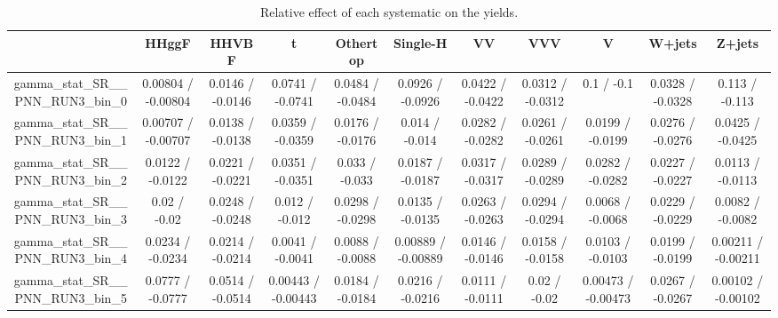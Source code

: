 \documentclass[10pt]{article}
\begin{document}
\begin{table}[htbp]
\begin{center}
\begin{tabular}{|c|c|c|c|c|c|c|c|c|c|c|}
\hline 
      & HHggF      & HHVBF      & t      & Othertop      & Single-H      & VV      & VVV      & V      & W+jets      & Z+jets \\ 
\hline 
  gamma_stat_SR__PNN_RUN3_bin_0 & 0.00804 / -0.00804 & 0.0146 / -0.0146 & 0.0741 / -0.0741 & 0.0484 / -0.0484 & 0.0926 / -0.0926 & 0.0422 / -0.0422 & 0.0312 / -0.0312 & 0.1 / -0.1 & 0.0328 / -0.0328 & 0.113 / -0.113 \\ 
  gamma_stat_SR__PNN_RUN3_bin_1 & 0.00707 / -0.00707 & 0.0138 / -0.0138 & 0.0359 / -0.0359 & 0.0176 / -0.0176 & 0.014 / -0.014 & 0.0282 / -0.0282 & 0.0261 / -0.0261 & 0.0199 / -0.0199 & 0.0276 / -0.0276 & 0.0425 / -0.0425 \\ 
  gamma_stat_SR__PNN_RUN3_bin_2 & 0.0122 / -0.0122 & 0.0221 / -0.0221 & 0.0351 / -0.0351 & 0.033 / -0.033 & 0.0187 / -0.0187 & 0.0317 / -0.0317 & 0.0289 / -0.0289 & 0.0282 / -0.0282 & 0.0227 / -0.0227 & 0.0113 / -0.0113 \\ 
  gamma_stat_SR__PNN_RUN3_bin_3 & 0.02 / -0.02 & 0.0248 / -0.0248 & 0.012 / -0.012 & 0.0298 / -0.0298 & 0.0135 / -0.0135 & 0.0263 / -0.0263 & 0.0294 / -0.0294 & 0.0068 / -0.0068 & 0.0229 / -0.0229 & 0.0082 / -0.0082 \\ 
  gamma_stat_SR__PNN_RUN3_bin_4 & 0.0234 / -0.0234 & 0.0214 / -0.0214 & 0.0041 / -0.0041 & 0.0088 / -0.0088 & 0.00889 / -0.00889 & 0.0146 / -0.0146 & 0.0158 / -0.0158 & 0.0103 / -0.0103 & 0.0199 / -0.0199 & 0.00211 / -0.00211 \\ 
  gamma_stat_SR__PNN_RUN3_bin_5 & 0.0777 / -0.0777 & 0.0514 / -0.0514 & 0.00443 / -0.00443 & 0.0184 / -0.0184 & 0.0216 / -0.0216 & 0.0111 / -0.0111 & 0.02 / -0.02 & 0.00473 / -0.00473 & 0.0267 / -0.0267 & 0.00102 / -0.00102 \\ 
\hline 
\end{tabular} 
\caption{Relative effect of each systematic on the yields.} 
\end{center} 
\end{table} 
\end{document}
